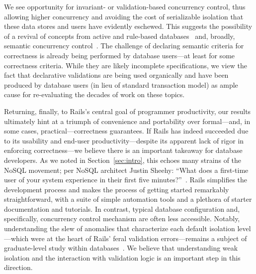 We see opportunity for invariant- or validation-based concurrency
control, thus allowing higher concurrency and avoiding the cost of
serializable isolation that these data stores and users have evidently
eschewed. This suggests the possibility of a revival of concepts from
active and rule-based databases~\cite{activedb-book} and, broadly,
semantic concurrency control~\cite{tamer-book}. The challenge of
declaring semantic criteria for correctness is already being performed
by database users---at least for some correctness criteria. While they
are likely incomplete specifications, we view the fact that
declarative validations are being used organically and have been
produced by database users (in lieu of standard transaction model) as
ample cause for re-evaluating the decades of work on these topics.

 Returning, finally, to Rails's central
goal of programmer productivity, our results ultimately hint at a
triumph of convenience and portability over formal---and, in some
cases, practical---correctness guarantees. If Rails has indeed
succeeded due to its usability and end-user productivity---despite its
apparent lack of rigor in enforcing correctness---we believe there is
an important takeaway for database developers. As we noted in
Section~\ref{sec:intro}, this echoes many strains of the NoSQL
movement; per NoSQL architect Justin Sheehy: ``What does a first-time
user of your system experience in their first five
minutes?''~\cite{marcus-talk}. Rails simplifies the development
process and makes the process of getting started remarkably
straightforward, with a suite of simple automation tools and a
plethora of starter documentation and tutorials. In contrast, typical
database configuration and, specifically, concurrency control
mechanism are often less accessible. Notably, understanding the slew
of anomalies that characterize each default isolation level---which
were at the heart of Rails' feral validation errors---remains a
subject of graduate-level study within
databases~\cite{adya-isolation,hat-vldb}. We believe that
understanding weak isolation and the interaction with validation logic
is an important step in this direction.




